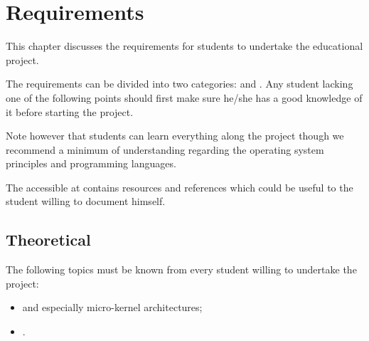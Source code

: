 %
%
%
%
%
%

%
%

\chapter{Requirements}
\label{chapter:requirements}

This chapter discusses the requirements for students to undertake the
 educational project.

\newpage

%
%

The requirements can be divided into two categories:  and
. Any student lacking one of the following points should
first make sure he/she has a good knowledge of it before starting the
project.

Note however that students can learn everything along the project though we
recommend a minimum of understanding regarding the operating system principles
and programming languages.

The   accessible at 
contains resources and references which could be useful to the student
willing to document himself.

%
%

\section{Theoretical}

The following topics must be known from every student willing to undertake
the project:

\begin{itemize}
  \item
     and especially micro-kernel
    architectures;
  \item
    .
\end{itemize}

%
%

